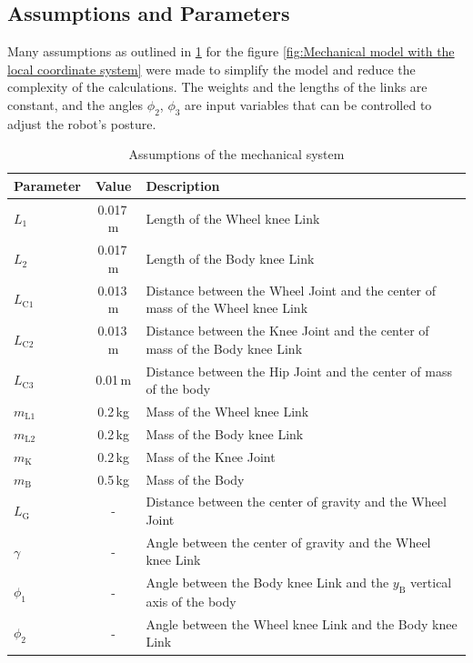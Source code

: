 	\newpage
\subsection{Assumptions and Parameters}
Many assumptions as outlined in \ref{tab:assumptions} for the figure \ref{fig:Mechanical model with the local coordinate system} were made to simplify the model and reduce the complexity of the calculations. The weights and the lengths of the links are constant, and the angles $\phi_{\mathrm{2}}$, $\phi_{\mathrm{3}}$ are input variables that can be controlled to adjust the robot's posture.
\begin{table}[h!]
    \centering
    \caption{Assumptions of the mechanical system}
    \label{tab:assumptions}
    \begin{tabular}{lcl}
        \toprule
        Parameter & Value & Description \\
        \midrule
        $L_{\mathrm{1}}$ & 0.017\,m & Length of the Wheel knee Link \\
        $L_{\mathrm{2}}$ & 0.017\,m & Length of the Body knee Link \\
        $L_{\mathrm{C1}}$ & 0.013\,m & Distance between the Wheel Joint and the center of mass of the Wheel knee Link \\
        $L_{\mathrm{C2}}$ & 0.013\,m & Distance between the Knee Joint and the center of mass of the Body knee Link \\
        $L_{\mathrm{C3}}$ & 0.01\,m & Distance between the Hip Joint and the center of mass of the body \\
        $m_{\mathrm{L1}}$ & 0.2\,kg & Mass of the Wheel knee Link \\
        $m_{\mathrm{L2}}$ & 0.2\,kg & Mass of the Body knee Link \\
        $m_{\mathrm{K}}$ & 0.2\,kg & Mass of the Knee Joint \\
        $m_{\mathrm{B}}$ & 0.5\,kg & Mass of the Body \\
        $L_{\mathrm{G}}$ & - & Distance between the center of gravity and the Wheel Joint \\
        $\gamma$ & - & Angle between the center of gravity and the Wheel knee Link \\
        $\phi_{\mathrm{1}}$ & - & Angle between the Body knee Link and the $y_{\mathrm{B}}$ vertical axis of the body \\
        $\phi_{\mathrm{2}}$ & - & Angle between the Wheel knee Link and the Body knee Link \\

\end{tabular}
\end{table}
